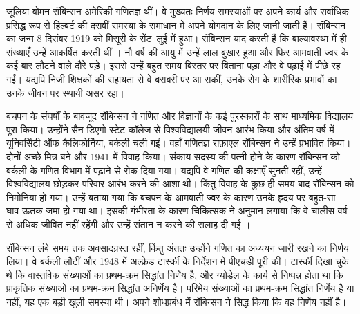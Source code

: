 \documentclass[../../../include/open-logic-section]{subfiles}
\begin{document}



जूलिया बोमन रॉबिन्सन अमेरिकी गणितज्ञ थीं। वे मुख्यतः निर्णय समस्याओं पर अपने
कार्य और सर्वाधिक प्रसिद्ध रूप से हिल्बर्ट की दसवीं समस्या के समाधान में
अपने योगदान के लिए जानी जाती हैं। रॉबिन्सन का जन्म 8 दिसंबर 1919 को
मिसूरी के सेंट~लुई में हुआ। रॉबिन्सन याद करती हैं कि बाल्यावस्था में ही
संख्याएँ उन्हें आकर्षित करती थीं \citep[4]{Reid1986}। नौ वर्ष की आयु में
उन्हें लाल बुखार हुआ और फिर आमवाती ज्वर के कई बार लौटने वाले दौरे पड़े। इससे
उन्हें बहुत समय बिस्तर पर बिताना पड़ा और वे पढ़ाई में पीछे रह गईं। यद्यपि
निजी शिक्षकों की सहायता से वे बराबरी पर आ सकीं, उनके रोग के शारीरिक प्रभावों
का उनके जीवन पर स्थायी असर रहा।

बचपन के संघर्षों के बावजूद रॉबिन्सन ने गणित और विज्ञानों के कई पुरस्कारों
के साथ माध्यमिक विद्यालय पूरा किया। उन्होंने सैन डिएगो स्टेट कॉलेज से
विश्वविद्यालयी जीवन आरंभ किया और अंतिम वर्ष में यूनिवर्सिटी ऑफ कैलिफोर्निया,
बर्कली चली गईं। वहाँ गणितज्ञ राफ़ाएल रॉबिन्सन ने उन्हें प्रभावित किया। दोनों
अच्छे मित्र बने और 1941 में विवाह किया। संकाय सदस्य की पत्नी होने के कारण
रॉबिन्सन को बर्कली के गणित विभाग में पढ़ाने से रोक दिया गया। यद्यपि वे गणित
की कक्षाएँ सुनती रहीं, उन्हें विश्वविद्यालय छोड़कर परिवार आरंभ करने की आशा
थी। किंतु विवाह के कुछ ही समय बाद रॉबिन्सन को निमोनिया हो गया। उन्हें बताया
गया कि बचपन के आमवाती ज्वर के कारण उनके हृदय पर बहुत-सा घाव-ऊतक जमा हो गया
था। इसकी गंभीरता के कारण चिकित्सक ने अनुमान लगाया कि वे चालीस वर्ष से अधिक
जीवित नहीं रहेंगी और उन्हें संतान न करने की सलाह दी गई
\citep[13]{Reid1986}।

रॉबिन्सन लंबे समय तक अवसादग्रस्त रहीं, किंतु अंततः उन्होंने गणित का अध्ययन
जारी रखने का निर्णय लिया। वे बर्कली लौटीं और 1948 में अल्फ्रेड टार्स्की के
निर्देशन में पीएचडी पूरी की। टार्स्की दिखा चुके थे कि वास्तविक संख्याओं का
प्रथम-क्रम सिद्धांत निर्णेय है, और ग्योडेल के कार्य से निष्पन्न होता था कि
प्राकृतिक संख्याओं का प्रथम-क्रम सिद्धांत अनिर्णेय है। परिमेय संख्याओं का
प्रथम-क्रम सिद्धांत निर्णेय है या नहीं, यह एक बड़ी खुली समस्या थी। अपने
शोधप्रबंध \citeyearpar{Robinson1949} में रॉबिन्सन ने सिद्ध किया कि वह निर्णेय
नहीं है।
\end{document}
